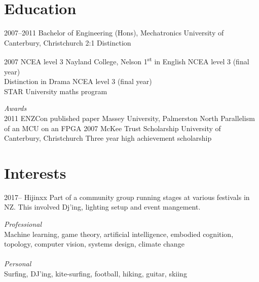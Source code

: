 \documentclass[print]{friggeri-cv} %
\begin{document}
\section{Education}
\begin{entrylist}
\entry
{2007--2011}
{Bachelor of Engineering (Hons), Mechatronics}
{University of Canterbury, Christchurch}
{2:1 Distinction}

\entry
{2007}
{NCEA level 3}
{Nayland College, Nelson}
{1\textsuperscript{st} in English NCEA level 3 (final year)\\
Distinction in Drama NCEA level 3 (final year)\\
STAR University maths program}

\emph{Awards}\\
\entry
{2011}
{ENZCon published paper}
{Massey University, Palmerston North}
{Parallelism of an MCU on an FPGA}
\entry
{2007}
{McKee Trust Scholarship}
{University of Canterbury, Christchurch}
{Three year high achievement scholarship}
\end{entrylist}

\section{Interests}
\begin{entrylist}
\entry 
{2017--}
{Hijinxx}
{}
{Part of a community group running stages at various festivals in NZ. This involved Dj'ing, lighting setup and event mangement.}
\end{entrylist}

\emph{Professional}\\ Machine learning, game theory, artificial intelligence, embodied cognition, topology, computer vision, systems design, climate change\\
\\
\emph{Personal}\\ Surfing, DJ'ing, kite-surfing, football, hiking, guitar, skiing
\end{document}
